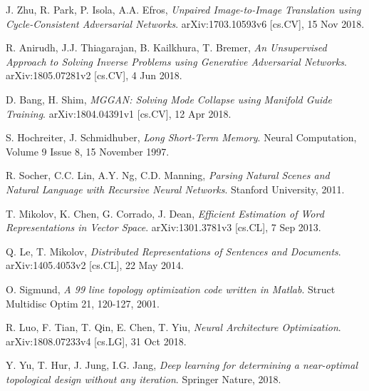\documentclass[a4paper]{article}
\begin{document}
\begin{thebibliography}{999}
  J. Zhu, R. Park, P. Isola, A.A. Efros,
  \emph{Unpaired Image-to-Image Translation using Cycle-Consistent Adversarial Networks}.
  arXiv:1703.10593v6 [cs.CV],
  15 Nov 2018.

  R. Anirudh, J.J. Thiagarajan, B. Kailkhura, T. Bremer,
  \emph{An Unsupervised Approach to Solving Inverse Problems using Generative Adversarial Networks}.
  arXiv:1805.07281v2 [cs.CV],
  4 Jun 2018.

  D. Bang, H. Shim,
  \emph{MGGAN: Solving Mode Collapse using Manifold Guide Training}.
  arXiv:1804.04391v1 [cs.CV],
  12 Apr 2018.

  S. Hochreiter, J. Schmidhuber,
  \emph{Long Short-Term Memory}.
  Neural Computation,
  Volume 9 Issue 8,
  15 November 1997.

  R. Socher, C.C. Lin, A.Y. Ng, C.D. Manning,
  \emph{Parsing Natural Scenes and Natural Language with Recursive Neural Networks}.
  Stanford University,
  2011.

  T. Mikolov, K. Chen, G. Corrado, J. Dean,
  \emph{Efficient Estimation of Word Representations in Vector Space}.
  arXiv:1301.3781v3 [cs.CL],
  7 Sep 2013.

  Q. Le, T. Mikolov,
  \emph{Distributed Representations of Sentences and Documents}.
  arXiv:1405.4053v2 [cs.CL],
  22 May 2014.


  O. Sigmund,
  \emph{A 99 line topology optimization code written in Matlab}.
  Struct Multidisc Optim 21,
  120-127,
  2001.

  R. Luo, F. Tian, T. Qin, E. Chen, T. Yiu,
  \emph{Neural Architecture Optimization}.
  arXiv:1808.07233v4 [cs.LG],
  31 Oct 2018.

  Y. Yu, T. Hur, J. Jung, I.G. Jang,
  \emph{Deep learning for determining a near-optimal topological design without any iteration}.
  Springer Nature,
  2018.

\end{thebibliography}
\end{document}
